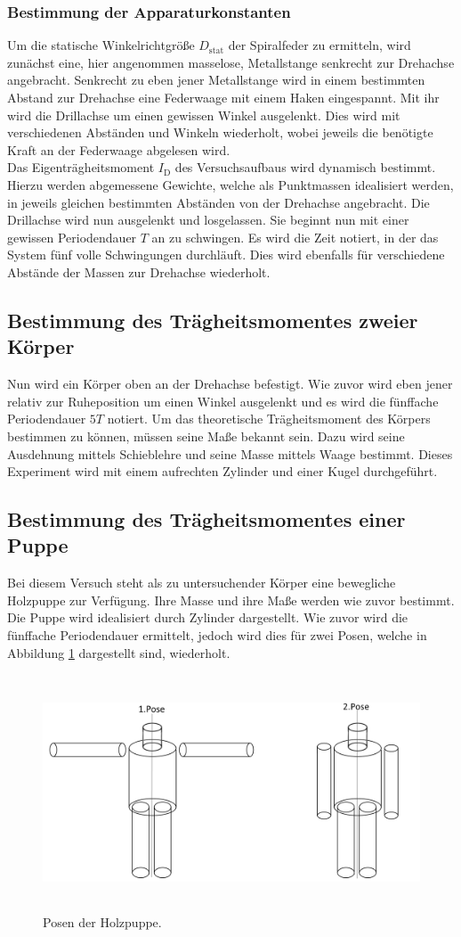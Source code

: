 \subsubsection{Bestimmung der Apparaturkonstanten}
Um die statische Winkelrichtgröße $D_\text{stat}$ der Spiralfeder zu ermitteln, wird zunächst eine, hier angenommen masselose, Metallstange senkrecht zur Drehachse angebracht.
Senkrecht zu eben jener Metallstange wird in einem bestimmten Abstand zur Drehachse eine Federwaage mit einem Haken eingespannt.
Mit ihr wird die Drillachse um einen gewissen Winkel ausgelenkt.
Dies wird mit verschiedenen Abständen und Winkeln wiederholt, wobei jeweils die benötigte Kraft an der Federwaage abgelesen wird.\\
Das Eigenträgheitsmoment $I_{\text{D}}$ des Versuchsaufbaus wird dynamisch bestimmt.
Hierzu werden abgemessene Gewichte, welche als Punktmassen idealisiert werden, in jeweils gleichen bestimmten Abständen von der Drehachse angebracht.
Die Drillachse wird nun ausgelenkt und losgelassen.
Sie beginnt nun mit einer gewissen Periodendauer $T$ an zu schwingen.
Es wird die Zeit notiert, in der das System fünf volle Schwingungen durchläuft.
Dies wird ebenfalls für verschiedene Abstände der Massen zur Drehachse wiederholt.

\subsection{Bestimmung des Trägheitsmomentes zweier Körper}
Nun wird ein Körper oben an der Drehachse befestigt.
Wie zuvor wird eben jener relativ zur Ruheposition um einen Winkel ausgelenkt und es wird die fünffache Periodendauer $5T$ notiert.
Um das theoretische Trägheitsmoment des Körpers bestimmen zu können, müssen seine Maße bekannt sein.
Dazu wird seine Ausdehnung mittels Schieblehre und seine Masse mittels Waage bestimmt.
Dieses Experiment wird mit einem aufrechten Zylinder und einer Kugel durchgeführt.

\subsection{Bestimmung des Trägheitsmomentes einer Puppe}
Bei diesem Versuch steht als zu untersuchender Körper eine bewegliche Holzpuppe zur Verfügung.
Ihre Masse und ihre Maße werden wie zuvor bestimmt.
Die Puppe wird idealisiert durch Zylinder dargestellt.
Wie zuvor wird die fünffache Periodendauer ermittelt, jedoch wird dies für zwei Posen, welche in Abbildung \ref{df:2} dargestellt sind, wiederholt.

\begin{figure}
  \centering
  \includegraphics[height=7cm]{Posen.png}
  \caption{Posen der Holzpuppe.}
  \label{df:2}
\end{figure}
